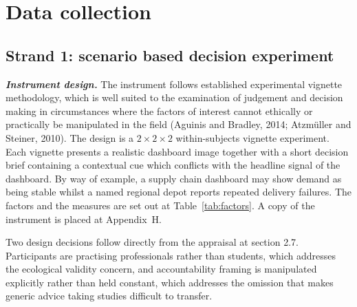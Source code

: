 \documentclass[12pt,a4paper]{article}
\begin{document}
\section{Data collection}

\subsection{Strand 1: scenario based decision experiment}

\textbf{\emph{Instrument design.}} The instrument follows established experimental vignette methodology,
which is well suited to the examination of judgement and decision making in circumstances where the factors
of interest cannot ethically or practically be manipulated in the field (Aguinis and Bradley, 2014;
Atzmüller and Steiner, 2010). The design is a $2\times2\times2$ within-subjects vignette experiment. Each
vignette presents a realistic dashboard image together with a short decision brief containing a contextual
cue which conflicts with the headline signal of the dashboard. By way of example, a supply chain dashboard
may show demand as being stable whilst a named regional depot reports repeated delivery failures. The
factors and the measures are set out at Table~\ref{tab:factors}. A copy of the instrument is placed at
Appendix~H.

Two design decisions follow directly from the appraisal at section 2.7. Participants are
practising professionals rather than students, which addresses the ecological validity concern,
and accountability framing is manipulated explicitly rather than held constant, which addresses
the omission that makes generic advice taking studies difficult to transfer.
\end{document}
